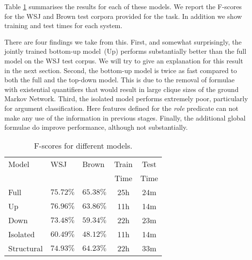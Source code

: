 Table \ref{tbl:results} summarises the results for each of these models. We report the F-scores for the WSJ and Brown test corpora provided for the task. In addition we show training and test times for each system. 

There are four findings we take from this. First, and somewhat surprisingly, the jointly trained bottom-up model~(Up) performs substantially better than the full model on the WSJ test corpus. We will try to give an explanation for this result in the next section. Second, the bottom-up model is twice as fast compared to both the full and the top-down model. This is due to the removal of formulae with existential quantifiers that would result in large clique sizes of the ground Markov Network. Third, the isolated model performs extremely poor, particularly for argument classification. Here features defined for the \emph{role} predicate can not make any use of the information in previous stages. Finally, the additional global formulae do improve performance, although not substantially.


\begin{table}
\begin{center}
\small
\begin{tabular}{|l|l|l|c|c|}\hline
Model                & WSJ                & Brown              & Train & Test\\
                     &                    &                    & Time & Time\\\hline\hline
Full         & $75.72\%$          & $\mathbf{65.38}\%$ & 25h & 24m\\\hline
Up            & $\mathbf{76.96\%}$ & $63.86\%$          & 11h & 14m\\\hline
Down             & $73.48\%$          & $59.34\%$          & 22h & 23m\\\hline
Isolated   & $60.49\%$          & $48.12\%$          & 11h & 14m\\\hline
Structural & $74.93\%$       & $64.23\%$          & 22h & 33m\\\hline   
\end{tabular}
\caption{F-scores for different models.}
\label{tbl:results}
\normalsize
\end{center}
\end{table}



